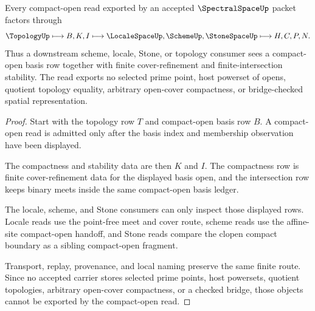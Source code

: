 \begin{theorem}
\label{thm:spectral-space-compact-open-stability}
Every compact-open read exported by an accepted $\SpectralSpaceUp$ packet factors through
$$
\TopologyUp \longmapsto B,K,I \longmapsto \LocaleSpaceUp,\SchemeUp,\StoneSpaceUp \longmapsto H,C,P,N .
$$
Thus a downstream scheme, locale, Stone, or topology consumer sees a compact-open basis row together with finite cover-refinement and finite-intersection stability. The read exports no selected prime point, host powerset of opens, quotient topology equality, arbitrary open-cover compactness, or bridge-checked spatial representation.
\end{theorem}
\begin{proof}
Start with the topology row $T$ and compact-open basis row $B$. A compact-open read is admitted only after the basis index and membership observation have been displayed.

The compactness and stability data are then $K$ and $I$. The compactness row is finite cover-refinement data for the displayed basis open, and the intersection row keeps binary meets inside the same compact-open basis ledger.

The locale, scheme, and Stone consumers can only inspect those displayed rows. Locale reads use the point-free meet and cover route, scheme reads use the affine-site compact-open handoff, and Stone reads compare the clopen compact boundary as a sibling compact-open fragment.

Transport, replay, provenance, and local naming preserve the same finite route. Since no accepted carrier stores selected prime points, host powersets, quotient topologies, arbitrary open-cover compactness, or a checked bridge, those objects cannot be exported by the compact-open read.
\end{proof}



